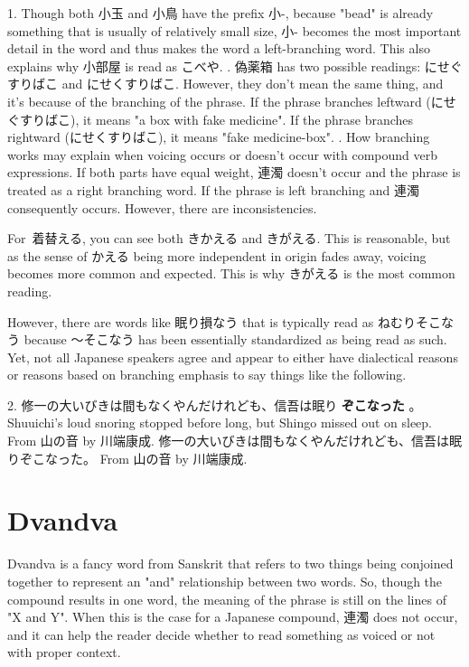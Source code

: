 \par{1. Though both 小玉 and 小鳥 have the prefix 小-, because "bead" is already something that is usually of relatively small size, 小- becomes the most important detail in the word and thus makes the word a left-branching word. This also explains why 小部屋 is read as こべや. \hfill{}. 偽薬箱 has two possible readings: にせぐすりばこ and にせくすりばこ. However, they don't mean the same thing, and it's because of the branching of the phrase. If the phrase branches leftward (にせぐすりばこ), it means "a box with fake medicine". If the phrase branches rightward (にせくすりばこ), it means "fake medicine-box". \hfill{}. How branching works may explain when voicing occurs or doesn't occur with compound verb expressions. If both parts have equal weight, 連濁 doesn't occur and the phrase is treated as a right branching word. If the phrase is left branching and 連濁 consequently occurs. However, there are inconsistencies. }

\par{ For 着替える, you can see both きかえる and きがえる. This is reasonable, but as the sense of かえる being more independent in origin fades away, voicing becomes more common and expected. This is why きがえる is the most common reading. }

\par{ However, there are words like 眠り損なう that is typically read as ねむりそこなう because ～そこなう has been essentially standardized as being read as such. Yet, not all Japanese speakers agree and appear to either have dialectical reasons or reasons based on branching emphasis to say things like the following. }

\par{2. 修一の大いびきは間もなくやんだけれども、信吾は眠り \textbf{ぞこなった }。 \hfill\break
Shuuichi's loud snoring stopped before long, but Shingo missed out on sleep. \hfill\break
From 山の音 by 川端康成. }
修一の大いびきは間もなくやんだけれども、信吾は眠りぞこなった。 \hfill\break
From 山の音 by 川端康成. \hfill\break
      
\section{Dvandva}
 
\par{ Dvandva is a fancy word from Sanskrit that refers to two things being conjoined together to represent an "and" relationship between two words. So, though the compound results in one word, the meaning of the phrase is still on the lines of "X and Y". When this is the case for a Japanese compound, 連濁 does not occur, and it can help the reader decide whether to read something as voiced or not with proper context. }

